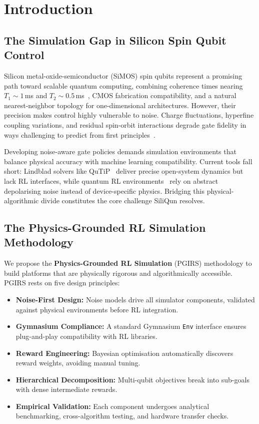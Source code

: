 
\section{Introduction}
\label{sec:introduction}

\subsection{The Simulation Gap in Silicon Spin Qubit Control}
\label{subsec:simulation_gap}

Silicon metal-oxide-semiconductor (SiMOS) spin qubits represent a promising path toward scalable quantum computing, combining coherence times nearing $T_1 \sim 1$\,ms and $T_2 \sim 0.5$\,ms~\cite{Xue2022,Noiri2022,Philips2022,Steinacker2023}, CMOS fabrication compatibility, and a natural nearest-neighbor topology for one-dimensional architectures. However, their precision makes control highly vulnerable to noise. Charge fluctuations, hyperfine coupling variations, and residual spin-orbit interactions degrade gate fidelity in ways challenging to predict from first principles~\cite{Veldhorst2015,Fogarty2018}.  

Developing noise-aware gate policies demands simulation environments that balance physical accuracy with machine learning compatibility. Current tools fall short: Lindblad solvers like QuTiP~\cite{Lambert2024} deliver precise open-system dynamics but lack RL interfaces, while quantum RL environments~\cite{VanDerLinde2023,QiskitGym2024} rely on abstract depolarising noise instead of device-specific physics. Bridging this physical-algorithmic divide constitutes the core challenge SiliQun resolves.

\subsection{The Physics-Grounded RL Simulation Methodology}
\label{subsec:intro_pgirs}

We propose the \textbf{Physics-Grounded RL Simulation} (PGIRS) methodology to build platforms that are physically rigorous and algorithmically accessible. PGIRS rests on five design principles:  

\begin{itemize}
  \item \textbf{Noise-First Design:} Noise models drive all simulator components, validated against physical environments before RL integration.  
  \item \textbf{Gymnasium Compliance:} A standard Gymnasium \texttt{Env} interface ensures plug-and-play compatibility with RL libraries.  
  \item \textbf{Reward Engineering:} Bayesian optimisation automatically discovers reward weights, avoiding manual tuning.  
  \item \textbf{Hierarchical Decomposition:} Multi-qubit objectives break into sub-goals with dense intermediate rewards.  
  \item \textbf{Empirical Validation:} Each component undergoes analytical benchmarking, cross-algorithm testing, and hardware transfer checks.  
\end{itemize}

